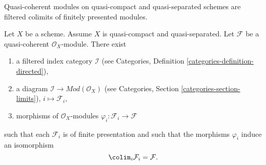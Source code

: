 \begin{lemma}
\label{lemma-directed-colimit-diagram-finite-presentation}
\begin{slogan}
Quasi-coherent modules on quasi-compact and quasi-separated schemes
are filtered colimits of finitely presented modules.
\end{slogan}
Let $X$ be a scheme. Assume $X$ is quasi-compact and quasi-separated.
Let $\mathcal{F}$ be a quasi-coherent $\mathcal{O}_X$-module.
There exist
\begin{enumerate}
\item a filtered index category $\mathcal{I}$ (see
Categories, Definition \ref{categories-definition-directed}),
\item a diagram $\mathcal{I} \to \textit{Mod}(\mathcal{O}_X)$ (see
Categories, Section \ref{categories-section-limits}),
$i \mapsto \mathcal{F}_i$,
\item morphisms of $\mathcal{O}_X$-modules
$\varphi_i : \mathcal{F}_i \to \mathcal{F}$
\end{enumerate}
such that each $\mathcal{F}_i$ is of finite presentation
and such that the morphisms $\varphi_i$ induce an isomorphism
$$
\colim_i \mathcal{F}_i
=
\mathcal{F}.
$$
\end{lemma}

